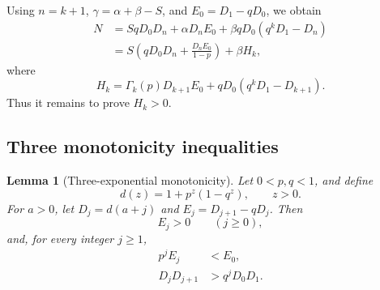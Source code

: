\documentclass[11pt]{article}
\theoremstyle{plain}
\newtheorem{lemma}[theorem]{Lemma}
\theoremstyle{definition}
\theoremstyle{remark}
\begin{document}
Using \(n=k+1\), \(\gamma=\alpha+\beta-S\), and \(E_0=D_1-qD_0\), we obtain
\begin{align*}
N
&=SqD_0D_n+\alpha D_nE_0
+\beta qD_0(q^kD_1-D_n)\\
&=S\left(qD_0D_n+\frac{D_nE_0}{1-p}\right)
+\beta H_k,
\end{align*}
where
\begin{equation}\label{eq:Hk-app}
H_k
=\Gamma_k(p)D_{k+1}E_0
+qD_0\left(q^kD_1-D_{k+1}\right).
\end{equation}
Thus it remains to prove \(H_k>0\).

\subsection{Three monotonicity inequalities}

\begin{lemma}[Three-exponential monotonicity]\label{lem:three-exp-app}
Let \(0<p,q<1\), and define
\[
d(z)=1+p^z(1-q^z),
\qquad z>0.
\]
For \(a>0\), let \(D_j=d(a+j)\) and \(E_j=D_{j+1}-qD_j\).  Then
\begin{equation}\label{eq:Epos-app}
E_j>0\qquad(j\ge0),
\end{equation}
and, for every integer \(j\ge1\),
\begin{align}
p^jE_j&<E_0,\label{eq:Edec-app}\\
D_jD_{j+1}&>q^jD_0D_1.\label{eq:Dprod-app}
\end{align}
\end{lemma}
\end{document}
